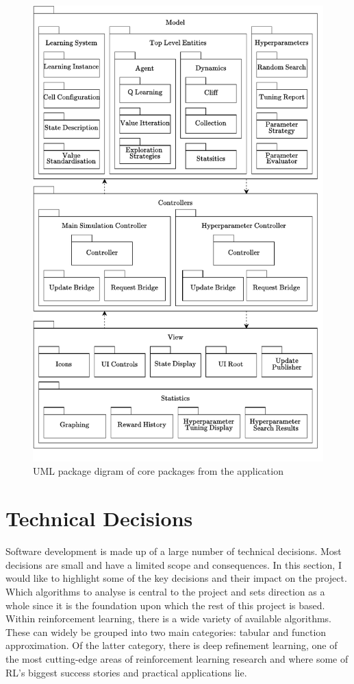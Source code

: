 \documentclass[]{final_report}
\begin{document}
\begin{figure}[H]
  \centering
  
  \includegraphics[width=\textwidth]{package_diagram-2.pdf}
  
  \caption{\label{fig:package-diagram} UML package digram of core packages from the application}
\end{figure}

\section{Technical Decisions}\label{section:technical-decsions}

Software development is made up of a large number of technical decisions. Most decisions are small and have a limited scope and consequences. In this section, I would like to highlight some of the key decisions and their impact on the project. Which algorithms to analyse is central to the project and sets direction as a whole since it is the foundation upon which the rest of this project is based. Within reinforcement learning, there is a wide variety of available algorithms. These can widely be grouped into two main categories: tabular and function approximation. Of the latter category, there is deep refinement learning, one of the most cutting-edge areas of reinforcement learning research and where some of RL's biggest success stories and practical applications lie. 
\end{document}
